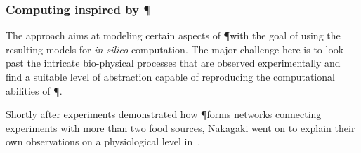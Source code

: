 


		\subsubsection{Computing inspired by \P}

			The approach aims at modeling certain aspects of \P with the goal of using the resulting models for \textit{in silico} computation. The major challenge here is to look past the intricate bio-physical processes that are observed experimentally and find a suitable level of abstraction capable of reproducing the computational abilities of \P.
			
			Shortly after experiments demonstrated how \P forms networks connecting experiments with more than two food sources, Nakagaki \etal went on to explain their own observations on a physiological level in~\cite{Tero2006115}. 

